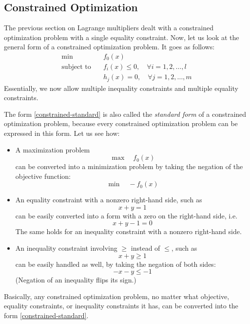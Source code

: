 \documentclass[a4paper]{article}
\theoremstyle{definition}
\begin{document}
\subsection{Constrained Optimization}

The previous section on Lagrange multipliers dealt with a constrained optimization problem with a single equality constraint.
Now, let us look at the general form of a constrained optimization problem.
It goes as follows:
\begin{equation}
	\label{constrained-standard}
	\begin{aligned}
		\min \quad & f_0(x) \\
		\text{subject to} \quad & f_i(x) \leq 0, \quad \forall i = 1, 2, \dots, l \\
		& h_j(x) = 0, \quad \forall j = 1, 2, \dots, m
	\end{aligned}
\end{equation}
Essentially, we now allow multiple inequality constraints and multiple equality constraints.

The form \eqref{constrained-standard} is also called the \textit{standard form} of a constrained optimization problem, because every constrained optimization problem can be expressed in this form.
Let us see how:
\begin{itemize}
	\item A maximization problem
		\begin{equation*}
			\max \quad f_0(x)
		\end{equation*}
		can be converted into a minimization problem by taking the negation of the objective function:
		\begin{equation*}
			\min \quad -f_0(x)
		\end{equation*}
	\item An equality constraint with a nonzero right-hand side, such as
		\begin{equation*}
			x + y = 1
		\end{equation*}
		can be easily converted into a form with a zero on the right-hand side, i.e.
		\begin{equation*}
			x + y - 1 = 0
		\end{equation*}
		The same holds for an inequality constraint with a nonzero right-hand side.
	\item An inequality constraint involving $\geq$ instead of $\leq$, such as
		\begin{equation*}
			x + y \geq 1
		\end{equation*}
		can be easily handled as well, by taking the negation of both sides:
		\begin{equation*}
			- x - y \leq -1
		\end{equation*}
		(Negation of an inequality flips its sign.)
\end{itemize}
Basically, any constrained optimization problem, no matter what objective, equality constraints, or inequality constraints it has, can be converted into the form \eqref{constrained-standard}.
\end{document}
